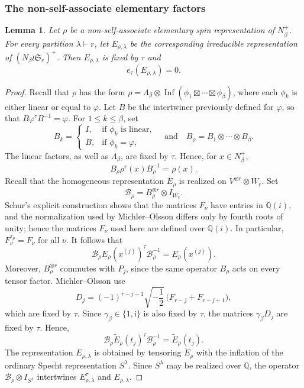 \documentclass[reqno]{amsart}
\DeclareMathOperator{\Inf}{Inf}
\newcommand{\sym}{\mathfrak{S}}
\newcommand{\Q}{\mathbb{Q}}
\newtheorem{lemma}[theorem]{Lemma}     %
\theoremstyle{definition}
\begin{document}
\subsubsection{The non-self-associate elementary factors}


\begin{lemma}
\label{lem:galois-NSA-elementary}
Let $\rho$ be a non-self-associate elementary spin representation of
$N_\beta^+$. For every partition $\lambda\vdash r$, let $E_{\rho,\lambda}$
be the corresponding irreducible representation of $(N_\beta\wr \sym_r)^+$.
Then $E_{\rho,\lambda}$ is fixed by $\tau$ and
\[
e_\tau(E_{\rho,\lambda})=0.
\]
\end{lemma}

\begin{proof}
Recall that $\rho$ has the form
$
\rho
=
\Lambda_\beta\otimes
\Inf(\phi_1\boxtimes\cdots\boxtimes\phi_\beta)$,
where each $\phi_k$ is either linear or equal to $\varphi$. Let $B$ be the
intertwiner previously defined for $\varphi$, so that $ B\varphi^\tau
B^{-1}=\varphi$. For $1\leq k\leq\beta$, set
\[
B_k=
\begin{cases}
I,&\text{if $\phi_k$ is linear},\\
B,&\text{if $\phi_k=\varphi$},
\end{cases}
\quad\text{and}\quad
B_\rho=B_1\otimes\cdots\otimes B_\beta.
\]
The linear factors, as well as $\Lambda_\beta$, are fixed by $\tau$.
Hence, for $ x\in N_\beta^+$,
\[
B_\rho\rho^\tau(x)B_\rho^{-1}
=
\rho(x).
\]
Recall that the homogeneous representation $E_\rho$ is realized on
$V^{\otimes r}\otimes W_r$.
Set
\[
\mathcal B_\rho
=
B_\rho^{\otimes r}\otimes I_{W_r}.
\]
Schur's explicit construction \cite[\S22, p. 209]{schur} shows that the matrices
\(F_\nu\) have entries in \(\mathbb Q(i)\), and the normalization used by
Michler--Olsson differs only by fourth roots of unity; hence the matrices
\(F_\nu\) used here are defined over \(\mathbb Q(i)\). In particular, $
F_\nu^{\tau_p}=F_\nu$ for all $\nu$.
It follows that
\[
\mathcal B_\rho
E_\rho(x^{(j)})^\tau
\mathcal B_\rho^{-1}
=
E_\rho(x^{(j)}).
\]
Moreover, $B_\rho^{\otimes r}$ commutes with $P_j$, since the same
operator $B_\rho$ acts on every tensor factor. 
Michler--Olsson use
\[
D_j
=
(-1)^{r-j-1}\sqrt{-\frac12}\,
\bigl(F_{r-j}+F_{r-j+1}\bigr),
\]
which are fixed by $\tau$. Since
$\gamma_\beta\in\{1,\mathrm i\}$ is also fixed by $\tau$, the matrices
$\gamma_\beta D_j$ are fixed by $\tau$. Hence,
\[
\mathcal B_\rho
\widetilde E_\rho(t_j)^\tau
\mathcal B_\rho^{-1}
=
\widetilde E_\rho(t_j).
\]
The representation $E_{\rho,\lambda}$ is obtained by tensoring $\widetilde
E_\rho$ with the inflation of the ordinary Specht representation
$S^\lambda$. Since $S^\lambda$ may be realized over $\Q$, the operator $
\mathcal B_\rho\otimes I_{S^\lambda} $ intertwines $E_{\rho,\lambda}^\tau$
and $E_{\rho,\lambda}$.


\end{proof}
\end{document}
